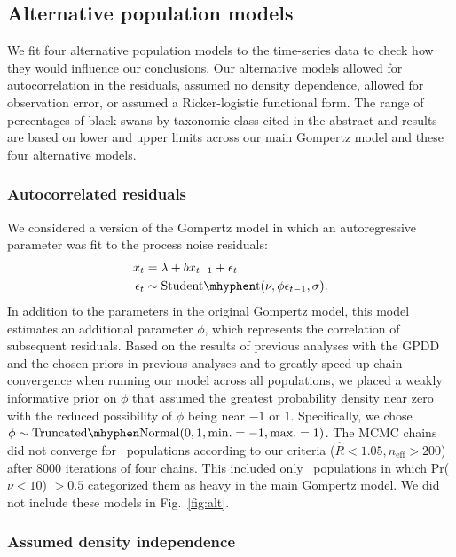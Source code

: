\subsection{Alternative population models}

We fit four alternative population models to the time-series data to check how
they would influence our conclusions. Our alternative models allowed for
autocorrelation in the residuals, assumed no density dependence, allowed for
observation error, or assumed a Ricker-logistic functional form. The range of
percentages of black swans by taxonomic class cited in the abstract and
results are based on lower and upper limits across our main Gompertz model and
these four alternative models.

\subsubsection{Autocorrelated residuals}

We considered a version of the Gompertz model in which an autoregressive
parameter was fit to the process noise residuals:
\begin{align*}
x_t &= \lambda + b x_{t-1} + \epsilon_t\\
\epsilon_t &\sim \mathrm{Student\mhyphen t}(\nu, \phi \epsilon_{t-1}, \sigma).
\end{align*}
In addition to the parameters in the original Gompertz model, this model
estimates an additional parameter $\phi$, which represents the correlation of
subsequent residuals. Based on the results of previous analyses with the GPDD
\citep[e.g.][]{connors2014} and the chosen priors in previous analyses
\citep[e.g.][]{thorson2014a} and to greatly speed up chain convergence when
running our model across all populations, we placed a weakly informative prior
on $\phi$ that assumed the greatest probability density near zero with the
reduced possibility of $\phi$ being near $-1$ or $1$. Specifically, we chose
$\phi \sim \mathrm{Truncated\mhyphen Normal}(0, 1, \mathrm{min.} = -1,
\mathrm{max.} = 1)$. The MCMC chains did not converge for
\modelsNoConvergeAROne\ populations according to our criteria ($\widehat{R} <
1.05, n_\mathrm{eff} > 200$) after 8000 iterations of four chains. This
  included only \modelsNoConvergeAROneHeavyBase\ populations in which Pr($\nu
  < 10$) $> 0.5$ categorized them as heavy in the main Gompertz model. We did
  not include these models in Fig.~\ref{fig:alt}.

\subsubsection{Assumed density independence}\label{assumed-density-independence}

